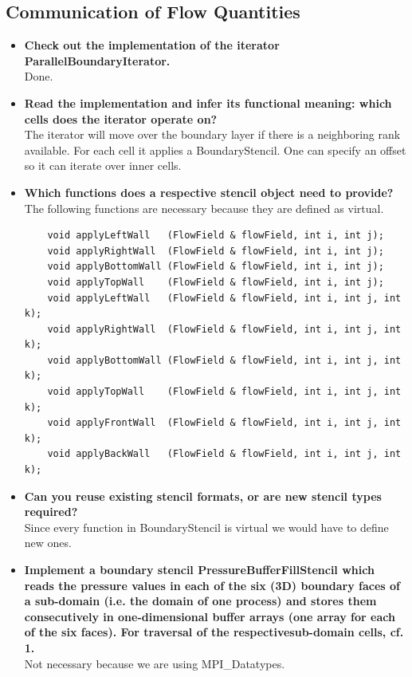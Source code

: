 \documentclass[a4paper]{article}
\begin{document}
\subsection{Communication of Flow Quantities}
\begin{itemize}
	\item \textbf{Check out the implementation of the iterator ParallelBoundaryIterator.}\\
	Done.
	\item \textbf{Read the implementation and infer its functional meaning: which cells does the iterator operate on?}\\
	The iterator will move over the boundary layer if there is a neighboring rank available. For each cell it applies a BoundaryStencil. One can specify an offset so it can iterate over inner cells.
	\newpage
	\item \textbf{Which functions does a respective stencil object need to provide?}\\
	The following functions are necessary because they are defined as virtual.
	\begin{lstlisting}
	void applyLeftWall   (FlowField & flowField, int i, int j);
	void applyRightWall  (FlowField & flowField, int i, int j);
	void applyBottomWall (FlowField & flowField, int i, int j);
	void applyTopWall    (FlowField & flowField, int i, int j);
	void applyLeftWall   (FlowField & flowField, int i, int j, int k);
	void applyRightWall  (FlowField & flowField, int i, int j, int k);
	void applyBottomWall (FlowField & flowField, int i, int j, int k);
	void applyTopWall    (FlowField & flowField, int i, int j, int k);
	void applyFrontWall  (FlowField & flowField, int i, int j, int k);
	void applyBackWall   (FlowField & flowField, int i, int j, int k);
	\end{lstlisting}
	
	\item \textbf{Can you reuse existing stencil formats, or are new stencil types required?}\\
	Since every function in BoundaryStencil is virtual we would have to define new ones.
	
	\item \textbf{Implement a boundary stencil PressureBufferFillStencil which reads the pressure values in each of the six (3D) boundary faces of a sub-domain (i.e. the domain of one process) and stores them consecutively in one-dimensional buffer arrays (one array for each of the six faces). For traversal of the respectivesub-domain cells, cf. 1.}\\
	Not necessary because we are using MPI\_Datatypes.
	

\end{itemize}
\end{document}
